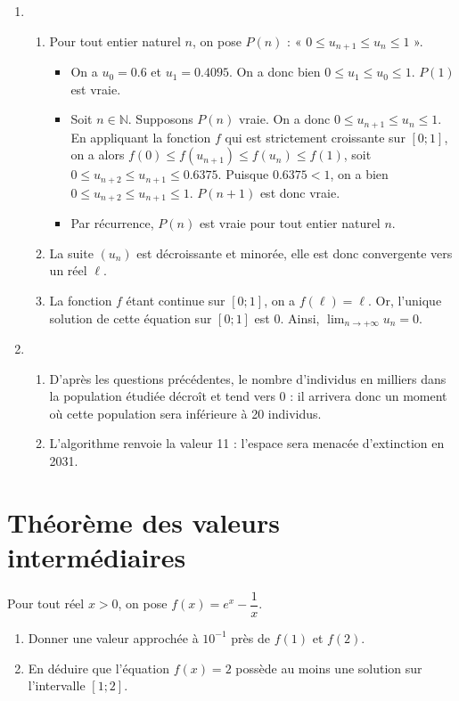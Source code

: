 \documentclass[11pt,fleqn, openany]{book} %
\begin{document}
\begin{solution}
\begin{enumerate}
\item \begin{enumerate}
\item Pour tout entier naturel $n$, on pose $P(n)$ : « $0\leqslant u_{n+1} \leqslant u_n \leqslant 1$ ».
\begin{itemize}
\item On a $u_0=0.6$ et $u_1=0.4095$. On a donc bien $0 \leqslant u_1 \leqslant u_0 \leqslant 1$. $P(1)$ est vraie.
\item Soit $n\in\mathbb{N}$. Supposons $P(n)$ vraie. On a donc $0\leqslant u_{n+1} \leqslant u_n \leqslant 1$. En appliquant la fonction $f$ qui est strictement croissante sur $[0;1]$, on a alors $f(0)\leqslant f(u_{n+1}) \leqslant f(u_n) \leqslant f(1)$, soit $0\leqslant u_{n+2} \leqslant u_{n+1} \leqslant 0.6375$. Puisque $0.6375<1$, on a bien $0\leqslant u_{n+2} \leqslant u_{n+1} \leqslant 1$. $P(n+1)$ est donc vraie.
\item Par récurrence, $P(n)$ est vraie pour tout entier naturel $n$.
\end{itemize}
\item La suite $(u_n)$ est décroissante et minorée, elle est donc convergente vers un réel $\ell$.
\item La fonction $f$ étant continue sur $[0;1]$, on a $f(\ell)=\ell$. Or, l'unique solution de cette équation sur $[0;1]$ est 0. Ainsi, $\displaystyle\lim_{n\to +\infty}u_n=0$.
\end{enumerate}
\item 
\begin{enumerate}
\item D'après les questions précédentes, le nombre d'individus en milliers dans la population étudiée décroît et tend vers 0 : il arrivera donc un moment où cette population sera inférieure à 20 individus.
\item L'algorithme renvoie la valeur 11 : l'espace sera menacée d'extinction en 2031.
\end{enumerate}
\end{enumerate}

\end{solution}






\section*{Théorème des valeurs intermédiaires}


\begin{exercise}Pour tout réel $x>0$, on pose $f(x)=e^x-\dfrac{1}{x}$.
\begin{enumerate}
\item Donner une valeur approchée à $10^{-1 }$ près de $f(1)$ et $f(2)$.
\item En déduire que l'équation $f(x)=2$ possède au moins une solution sur l'intervalle $[1;2]$.\end{enumerate}
\end{exercise}
\end{document}

